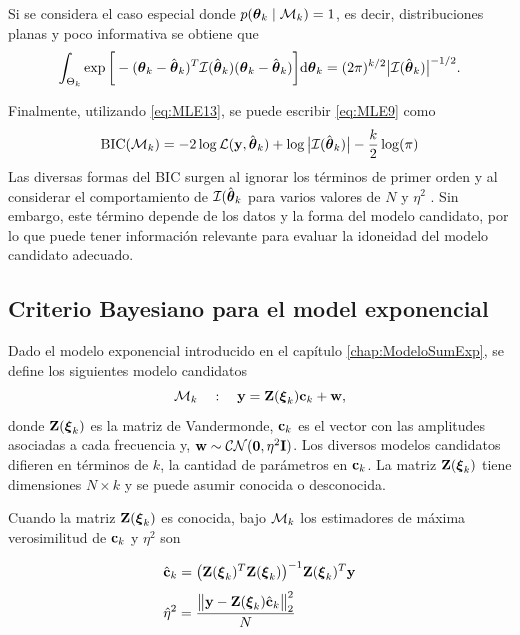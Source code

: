 Si se considera el caso especial donde $p(\boldsymbol{\theta}_k\mid\mathcal{M}_k)=1$, es decir, distribuciones planas y poco informativa se obtiene que
\begin{equation}
	\int_{\Theta_k}\exp\bigg[-(\boldsymbol{\theta}_k-\hat{\boldsymbol{\theta}}_k)^T\mathcal{I}(\hat{\boldsymbol{\theta}}_k)(\boldsymbol{\theta}_k-\hat{\boldsymbol{\theta}}_k)\bigg]\mathrm{d}\boldsymbol{\theta}_k = (2\pi)^{k/2}\big|\mathcal{I}(\hat{\boldsymbol{\theta}}_k)\big|^{-1/2}.
	\label{eq:MLE13}
\end{equation}

Finalmente, utilizando \eqref{eq:MLE13}, se puede escribir \eqref{eq:MLE9} como
\begin{equation}
	\mathrm{BIC}(\mathcal{M}_k) = -2\log\mathcal{L}(\mathbf{y},\hat{\boldsymbol{\theta}}_k) + \log\big|\mathcal{I}(\hat{\boldsymbol{\theta}}_k)\big| - \frac{k}{2}\log(\pi)
	\label{eq:MLE14}
\end{equation}
Las diversas formas del BIC surgen al ignorar los términos de primer orden y al considerar el comportamiento de $\mathcal{I}(\hat{\boldsymbol{\theta}}_k$ para varios valores de $N$ y $\eta^2$ \cite{Stoica2004}. Sin embargo, este término depende de los datos y la forma del modelo candidato, por lo que puede tener información relevante para evaluar la idoneidad del modelo candidato adecuado.

\subsection{Criterio Bayesiano para el model exponencial}

Dado el modelo exponencial introducido en el capítulo \eqref{chap:ModeloSumExp}, se define los siguientes modelo candidatos
\begin{equation}
	\mathcal{M}_k\quad : \quad \mathbf{y} = \mathbf{Z}(\boldsymbol{\xi}_k)\mathbf{c}_k + \mathbf{w},
	\label{eq:BIC2} 
\end{equation}
donde $\mathbf{Z}(\boldsymbol{\xi}_k)$ es la matriz de Vandermonde, $\mathbf{c}_k$ es el vector con las amplitudes asociadas a cada frecuencia y, $\mathbf{w}\sim\mathcal{CN}(\mathbf{0},\eta^2\mathbf{I})$. Los diversos modelos candidatos difieren en términos de $k$, la cantidad de parámetros en $\mathbf{c}_k$. La matriz $\mathbf{Z}(\boldsymbol{\xi}_k)$ tiene dimensiones $N\times k$ y se puede asumir conocida o desconocida.

Cuando la matriz $\mathbf{Z}(\boldsymbol{\xi}_k)$ es conocida, bajo $\mathcal{M}_k$ los estimadores de máxima verosimilitud de $\mathbf{c}_k$ y $\eta^2$ son

\begin{equation}
	\begin{aligned}
		& \hat{\mathbf{c}}_k = \big(\mathbf{Z}(\boldsymbol{\xi}_k)^T\mathbf{Z}(\boldsymbol{\xi}_k)\big)^{-1}\mathbf{Z}(\boldsymbol{\xi}_k)^T\mathbf{y}\\[0.3em]
		& \hat{\eta}^2 = \frac{\big\|\mathbf{y} - \mathbf{Z}(\boldsymbol{\xi}_k)\hat{\mathbf{c}}_k\big\|_2^2}{N}
	\end{aligned}
	\label{Eq:BIC3}
\end{equation}

